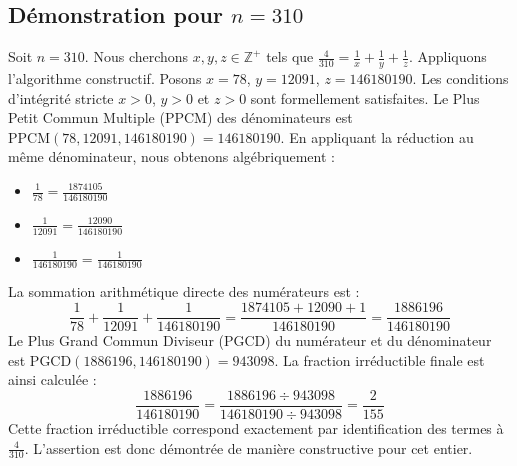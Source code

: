 \documentclass[11pt,a4paper]{article}
\begin{document}
\subsection{Démonstration pour $n = 310$}
Soit $n = 310$. Nous cherchons $x, y, z \in \mathbb{Z}^{+}$ tels que $\frac{4}{310} = \frac{1}{x} + \frac{1}{y} + \frac{1}{z}$.
Appliquons l'algorithme constructif. Posons $x = 78$, $y = 12091$, $z = 146180190$.
Les conditions d'intégrité stricte $x > 0$, $y > 0$ et $z > 0$ sont formellement satisfaites.
Le Plus Petit Commun Multiple (PPCM) des dénominateurs est $\text{PPCM}(78, 12091, 146180190) = 146180190$.
En appliquant la réduction au même dénominateur, nous obtenons algébriquement :
\begin{itemize}
    \item $\frac{1}{78} = \frac{1874105}{146180190}$
    \item $\frac{1}{12091} = \frac{12090}{146180190}$
    \item $\frac{1}{146180190} = \frac{1}{146180190}$
\end{itemize}
La sommation arithmétique directe des numérateurs est :
$$ \frac{1}{78} + \frac{1}{12091} + \frac{1}{146180190} = \frac{1874105 + 12090 + 1}{146180190} = \frac{1886196}{146180190} $$
Le Plus Grand Commun Diviseur (PGCD) du numérateur et du dénominateur est $\text{PGCD}(1886196, 146180190) = 943098$.
La fraction irréductible finale est ainsi calculée :
$$ \frac{1886196}{146180190} = \frac{1886196 \div 943098}{146180190 \div 943098} = \frac{2}{155} $$
Cette fraction irréductible correspond exactement par identification des termes à $\frac{4}{310}$. L'assertion est donc démontrée de manière constructive pour cet entier.
\end{document}
